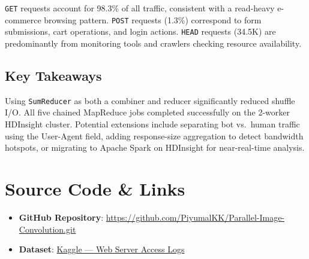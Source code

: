 \documentclass[12pt,a4paper]{article}
\begin{document}
\texttt{GET} requests account for 98.3\% of all traffic, consistent with a read-heavy e-commerce browsing pattern. \texttt{POST} requests (1.3\%) correspond to form submissions, cart operations, and login actions. \texttt{HEAD} requests (34.5K) are predominantly from monitoring tools and crawlers checking resource availability.

\subsection{Key Takeaways}

Using \texttt{SumReducer} as both a combiner and reducer significantly reduced shuffle I/O. All five chained MapReduce jobs completed successfully on the 2-worker HDInsight cluster. Potential extensions include separating bot vs.\ human traffic using the User-Agent field, adding response-size aggregation to detect bandwidth hotspots, or migrating to Apache Spark on HDInsight for near-real-time analysis.

\section{Source Code \& Links}

\begin{itemize}
    \item \textbf{GitHub Repository}: \url{https://github.com/PiyumalKK/Parallel-Image-Convolution.git}
    \item \textbf{Dataset}: \href{https://www.kaggle.com/datasets/eliasdabbas/web-server-access-logs}{Kaggle --- Web Server Access Logs}
\end{itemize}

\end{document}
